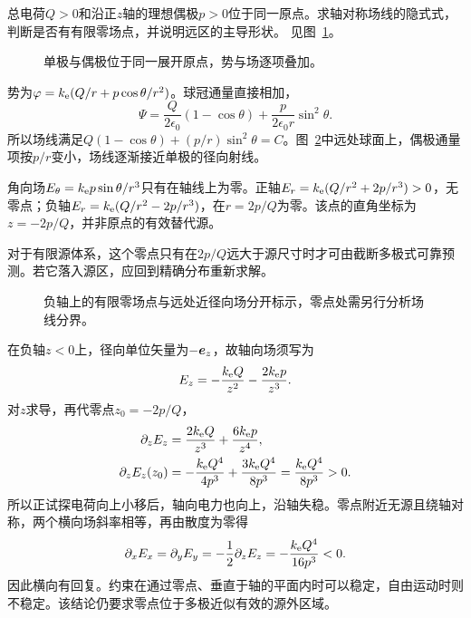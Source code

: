 \begin{exercise}[点电荷加偶极后的场线]\label{ex:es1-h16}
总电荷$Q>0$和沿正$z$轴的理想偶极$p>0$位于同一原点。求轴对称场线的隐式式，判断是否有有限零场点，并说明远区的主导形状。 见图~\ref{fig:es1-h16-q}。
\end{exercise}

\begin{figure}[H]\centering
{}
\caption{单极与偶极位于同一展开原点，势与场逐项叠加。}\label{fig:es1-h16-q}
\end{figure}
\begin{solution}
势为$\varphi=k_{\rm e}(Q/r+p\cos\theta/r^2)$。球冠通量直接相加，
\[\Psi=\frac Q{2\epsilon_0}(1-\cos\theta)
+\frac p{2\epsilon_0r}\sin^2\theta.
\]
所以场线满足$Q(1-\cos\theta)+(p/r)\sin^2\theta=C$。图~\ref{fig:es1-h16-s}中远处球面上，偶极通量项按$p/r$变小，场线逐渐接近单极的径向射线。

角向场$E_\theta=k_{\rm e} p\sin\theta/r^3$只有在轴线上为零。正轴$E_r=k_{\rm e}(Q/r^2+2p/r^3)>0$，无零点；负轴$E_r=k_{\rm e}(Q/r^2-2p/r^3)$，在$r=2p/Q$为零。该点的直角坐标为$z=-2p/Q$，并非原点的有效替代源。

对于有限源体系，这个零点只有在$2p/Q$远大于源尺寸时才可由截断多极式可靠预测。若它落入源区，应回到精确分布重新求解。
\begin{figure}[H]\centering
{}
\caption{负轴上的有限零场点与远处近径向场分开标示，零点处需另行分析场线分界。}\label{fig:es1-h16-s}
\end{figure}


在负轴$z<0$上，径向单位矢量为$-\bm{e}_z$，故轴向场须写为
\[E_z=-\frac{k_{\rm e} Q}{z^2}-\frac{2k_{\rm e} p}{z^3}.
\]
对$z$求导，再代零点$z_0=-2p/Q$，
\[\begin{aligned}
\partial_zE_z&=\frac{2k_{\rm e} Q}{z^3}+\frac{6k_{\rm e} p}{z^4},\\
\partial_zE_z(z_0)&=-\frac{k_{\rm e} Q^4}{4p^3}
+\frac{3k_{\rm e} Q^4}{8p^3}
=\frac{k_{\rm e} Q^4}{8p^3}>0.
\end{aligned}\]
所以正试探电荷向上小移后，轴向电力也向上，沿轴失稳。零点附近无源且绕轴对称，两个横向场斜率相等，再由散度为零得
\[\partial_xE_x=\partial_yE_y
=-\frac12\partial_zE_z=-\frac{k_{\rm e} Q^4}{16p^3}<0.
\]
因此横向有回复。约束在通过零点、垂直于轴的平面内时可以稳定，自由运动时则不稳定。该结论仍要求零点位于多极近似有效的源外区域。\end{solution}
